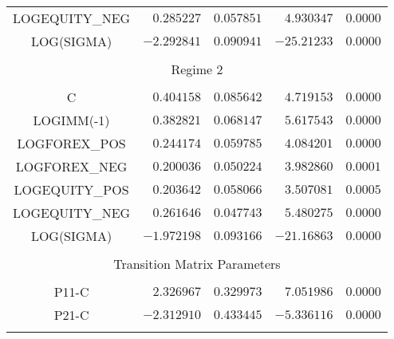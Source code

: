 \begin{tabular}{lrrrr}
\multicolumn{1}{c}{LOGEQUITY\_NEG}&\multicolumn{1}{r}{$0.285227$}&\multicolumn{1}{r}{$0.057851$}&\multicolumn{1}{r}{$4.930347$}&\multicolumn{1}{r}{$0.0000$}\\
\multicolumn{1}{c}{LOG(SIGMA)}&\multicolumn{1}{r}{$-2.292841$}&\multicolumn{1}{r}{$0.090941$}&\multicolumn{1}{r}{$-25.21233$}&\multicolumn{1}{r}{$0.0000$}\\
[4.5pt] \hline \\ [-4.5pt]
\multicolumn{5}{c}{Regime 2}\\
[4.5pt] \hline \\ [-4.5pt]
\multicolumn{1}{c}{C}&\multicolumn{1}{r}{$0.404158$}&\multicolumn{1}{r}{$0.085642$}&\multicolumn{1}{r}{$4.719153$}&\multicolumn{1}{r}{$0.0000$}\\
\multicolumn{1}{c}{LOGIMM(-1)}&\multicolumn{1}{r}{$0.382821$}&\multicolumn{1}{r}{$0.068147$}&\multicolumn{1}{r}{$5.617543$}&\multicolumn{1}{r}{$0.0000$}\\
\multicolumn{1}{c}{LOGFOREX\_POS}&\multicolumn{1}{r}{$0.244174$}&\multicolumn{1}{r}{$0.059785$}&\multicolumn{1}{r}{$4.084201$}&\multicolumn{1}{r}{$0.0000$}\\
\multicolumn{1}{c}{LOGFOREX\_NEG}&\multicolumn{1}{r}{$0.200036$}&\multicolumn{1}{r}{$0.050224$}&\multicolumn{1}{r}{$3.982860$}&\multicolumn{1}{r}{$0.0001$}\\
\multicolumn{1}{c}{LOGEQUITY\_POS}&\multicolumn{1}{r}{$0.203642$}&\multicolumn{1}{r}{$0.058066$}&\multicolumn{1}{r}{$3.507081$}&\multicolumn{1}{r}{$0.0005$}\\
\multicolumn{1}{c}{LOGEQUITY\_NEG}&\multicolumn{1}{r}{$0.261646$}&\multicolumn{1}{r}{$0.047743$}&\multicolumn{1}{r}{$5.480275$}&\multicolumn{1}{r}{$0.0000$}\\
\multicolumn{1}{c}{LOG(SIGMA)}&\multicolumn{1}{r}{$-1.972198$}&\multicolumn{1}{r}{$0.093166$}&\multicolumn{1}{r}{$-21.16863$}&\multicolumn{1}{r}{$0.0000$}\\
[4.5pt] \hline \\ [-4.5pt]
\multicolumn{5}{c}{Transition Matrix Parameters}\\
[4.5pt] \hline \\ [-4.5pt]
\multicolumn{1}{c}{P11-C}&\multicolumn{1}{r}{$2.326967$}&\multicolumn{1}{r}{$0.329973$}&\multicolumn{1}{r}{$7.051986$}&\multicolumn{1}{r}{$0.0000$}\\
\multicolumn{1}{c}{P21-C}&\multicolumn{1}{r}{$-2.312910$}&\multicolumn{1}{r}{$0.433445$}&\multicolumn{1}{r}{$-5.336116$}&\multicolumn{1}{r}{$0.0000$}\\
[4.5pt] \hline \\ [-4.5pt]

\end{tabular}
